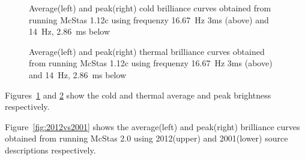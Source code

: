 \documentclass{elsarticle}
\begin{document}
\begin{figure}[h!]
\begin{minipage}{\linewidth}
\centering
{}
\caption{Average(left) and peak(right) cold brilliance curves obtained from running McStas 1.12c using frequenzy 16.67~Hz 3ms (above) and 14~Hz, 2.86~ms below}
\label{fig:2001}
\end{minipage}\hfill
\end{figure}


\begin{figure}[h!]
\begin{minipage}{\linewidth}
\centering
{}
\caption{Average(left) and peak(right) thermal brilliance curves obtained from running McStas 1.12c using frequenzy 16.67~Hz 3ms (above) and 14~Hz, 2.86~ms below}
\label{fig:2001_t}
\end{minipage}\hfill
\end{figure}


Figures~\ref{fig:2001} and \ref{fig:2001_t} show the cold and thermal average and peak brightness respectively.

Figure~\ref{fig:2012vs2001} shows the average(left) and peak(right) brilliance curves obtained from running McStas 2.0 using 2012(upper) and 2001(lower) source descriptions respectively.
















\end{document}
